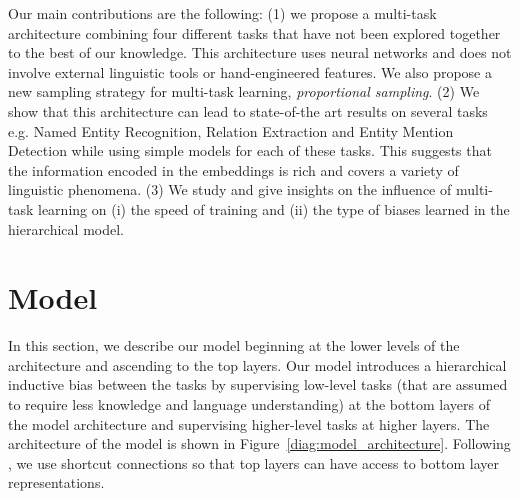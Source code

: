 \documentclass[letterpaper]{article}
\begin{document}
Our main contributions are the following:
(1) we propose a multi-task architecture combining four different tasks that have not been explored together to the best of our knowledge. This architecture uses neural networks and does not involve external linguistic tools or hand-engineered features. We also propose a new sampling strategy for multi-task learning, \textit{proportional sampling}.
(2) We show that this architecture can lead to state-of-the art results on several tasks e.g. Named Entity Recognition, Relation Extraction and Entity Mention Detection while using simple models for each of these tasks. This suggests that the information encoded in the embeddings is rich and covers a variety of linguistic phenomena.
(3) We study and give insights on the influence of multi-task learning on (i) the speed of training and (ii) the type of biases learned in the hierarchical model.



\section{Model}

In this section, we describe our model beginning at the lower levels of the architecture and ascending to the top layers. Our model introduces a hierarchical inductive bias between the tasks by supervising low-level tasks (that are assumed to require less knowledge and language understanding) at the bottom layers of the model architecture and supervising higher-level tasks at higher layers. The architecture of the model is shown in Figure~\ref{diag:model_architecture}. Following \cite{Hashimoto2017}, we use shortcut connections so that top layers can have access to bottom layer representations.
\end{document}
